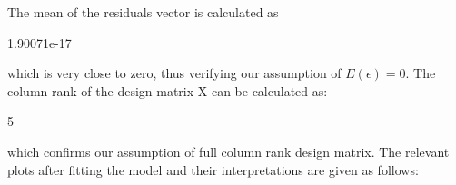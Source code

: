\documentclass[12pt]{article}
\begin{document}
The mean of the residuals vector is calculated as 
\begin{Schunk}
\begin{Soutput}
[1] 1.90071e-17
\end{Soutput}
\end{Schunk}
which is very close to zero, thus verifying our assumption of $E(\epsilon)=0$. The column rank of the design matrix X can be calculated as:
\begin{Schunk}
\begin{Soutput}
[1] 5
\end{Soutput}
\end{Schunk}
which confirms our assumption of full column rank design matrix.
The relevant plots after fitting the model and their interpretations are given as follows:
\clearpage
\end{document}
